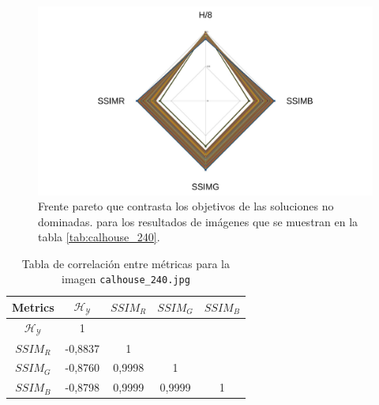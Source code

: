     \begin{figure}[H]
    \centering
    \includegraphics[width=\textwidth]{./Figures/calhouse_240/calhouse_240_2.jpg}
    \caption{Frente pareto que contrasta los objetivos de las soluciones no dominadas. para los resultados de imágenes que se muestran en la tabla \ref{tab:calhouse_240}.}
    \label{fig:calhouse2402fp}
    \end{figure}

\begin{table}[H]
\setlength{\abovecaptionskip}{2pt plus 3pt minus 2pt} %
\caption[Parámetros de entrada para $MOPSO$]{Tabla de correlación entre métricas para la imagen \texttt{calhouse\_240.jpg}}
\begin{center}
 \begin{tabular}{||c | c c c c||} 
 \hline
Metrics & $\mathscr{H_Y}$ & $SSIM_R$ & $SSIM_G$ & $SSIM_B$ \\ 
\hline
$\mathscr{H_Y}$ & 1 &  &  & \\ 
\hline
$SSIM_R$ & -0,8837 & 1 &  \\ 
\hline
$SSIM_G$ & -0,8760 & 0,9998  & 1  & \\ 
\hline
$SSIM_B$ & -0,8798 & 0,9999  & 0,9999  & 1 \\ 
\hline
\end{tabular}
\end{center}
\label{table:correlacion}
\end{table}


